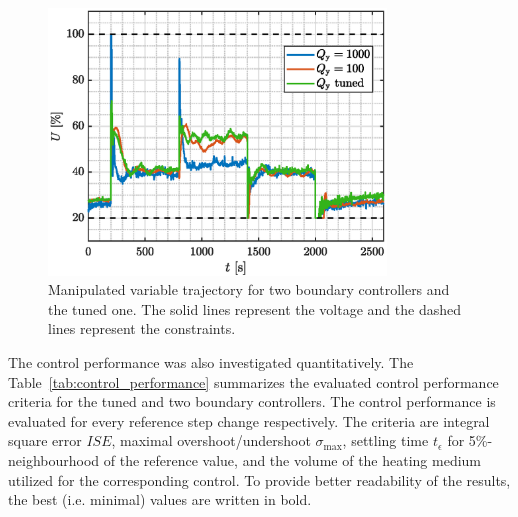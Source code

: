 \documentclass[preprint,12pt]{elsarticle}
\begin{document}
\begin{figure}
	\begin{center}
		\includegraphics[width=0.8\textwidth]{images/MV}
		\caption{Manipulated variable trajectory for two boundary controllers and the tuned one. The solid lines represent the voltage and the dashed lines represent the constraints.}
		\label{fig:MV}
	\end{center}
\end{figure}

The control performance was also investigated quantitatively. The Table~\ref{tab:control_performance} summarizes the evaluated control performance criteria for the tuned and two boundary controllers. The control performance is evaluated for every reference step change respectively. The criteria are integral square error $ISE$, maximal overshoot/undershoot $\sigma_{\mathrm{max}}$, settling time $t_{\epsilon}$ for 5\%-neighbourhood of the reference value, and the volume of the heating medium utilized for the corresponding control. To provide better readability of the results, the best (i.e. minimal) values are written in bold. 
\end{document}
